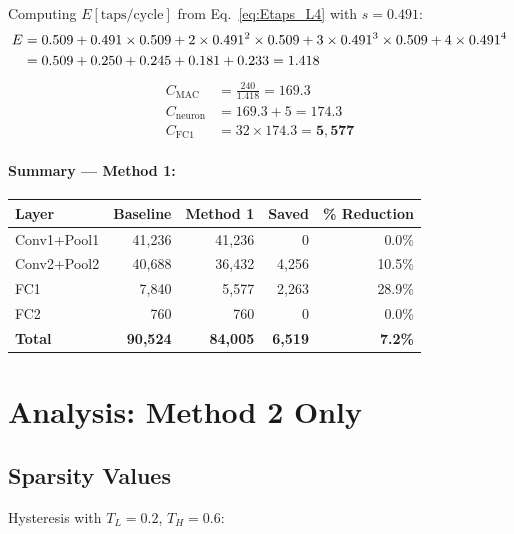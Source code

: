 \documentclass[11pt,a4paper]{article}
\begin{document}
Computing $E[\text{taps/cycle}]$ from Eq.~\eqref{eq:Etaps_L4} with $s = 0.491$:
\begin{align}
E &= 0.509 + 0.491 \times 0.509 + 2 \times 0.491^2 \times 0.509
     + 3 \times 0.491^3 \times 0.509 + 4 \times 0.491^4 \notag \\
  &= 0.509 + 0.250 + 0.245 + 0.181 + 0.233 = 1.418
\end{align}
\vspace{-12pt}
\begin{align}
C_{\text{MAC}} &= \frac{240}{1.418} = 169.3 \\
C_{\text{neuron}} &= 169.3 + 5 = 174.3 \\
C_{\text{FC1}} &= 32 \times 174.3 = \mathbf{5{,}577}
\end{align}

\paragraph{Summary — Method 1:}
\begin{center}
\begin{tabular}{lrrrr}
\toprule
\textbf{Layer} & \textbf{Baseline} & \textbf{Method 1} & \textbf{Saved} & \textbf{\% Reduction} \\
\midrule
Conv1+Pool1 & 41,236 & 41,236 & 0 & 0.0\% \\
Conv2+Pool2 & 40,688 & 36,432 & 4,256 & 10.5\% \\
FC1         & 7,840  & 5,577  & 2,263 & 28.9\% \\
FC2         & 760    & 760    & 0 & 0.0\% \\
\midrule
\textbf{Total} & \textbf{90,524} & \textbf{84,005} & \textbf{6,519} & \textbf{7.2\%} \\
\bottomrule
\end{tabular}
\end{center}

\section{Analysis: Method 2 Only}
\label{sec:m2only}

\subsection{Sparsity Values}

Hysteresis with $T_L = 0.2$, $T_H = 0.6$:
\end{document}
